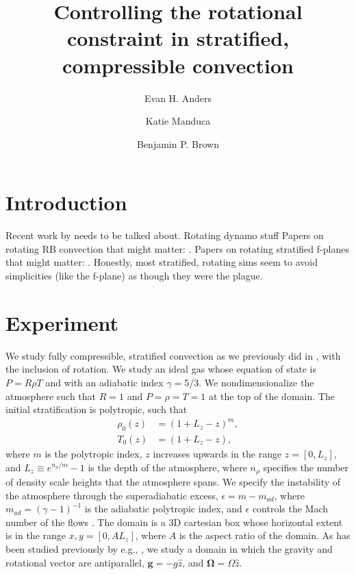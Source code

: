 \documentclass[twocolumn, amsmath, amsfonts, amssymb]{aastex62}
\begin{document}
\title{Controlling the rotational constraint in stratified, compressible convection}


\author{Evan H. Anders}
\author{Katie Manduca}
\author{Benjamin P. Brown}


\begin{abstract}
\end{abstract}


\section{Introduction}
\label{sec:intro}
Recent work by \cite{featherstone&hindman2016} needs to be talked about.
Rotating dynamo stuff \cite{busse2002, brown&all2008, brown&all2010, brown&all2011} 
Papers on rotating RB convection that might matter:
\cite{hathaway&somerville1983, julien&all1996, zhong&all2009, julien&all2012, stellmach&all2014}.
Papers on rotating stratified f-planes that might matter:
\cite{brummell&all1996, brummell&all1998, calkins&all2015a}.  Honestly, most stratified, rotating sims
seem to avoid simplicities (like the f-plane) as though they were the plague.

\section{Experiment} 
\label{sec:experiment}
We study fully compressible, stratified 
convection as we previously did in \cite{anders&brown2017}, with 
the inclusion of rotation. We study an ideal gas whose
equation of state is $P = R \rho T$ and with an adiabatic
index $\gamma = 5/3$. We nondimensionalize the atmosphere such that
$R = 1$ and $P = \rho = T = 1$ at the top of the domain.
The initial stratification is polytropic, such that
\begin{equation}
\begin{split}
\rho_0(z) &= (1 + L_z - z)^m, \\
T_0(z)    &= (1 + L_z - z),
\label{eqn:polytrope}
\end{split}
\end{equation}
where $m$ is the polytropic index,
$z$ increases upwards in the range $z = [0, L_z]$, and
$L_z \equiv e^{n_\rho/m} - 1$ is the depth of the atmosphere,
where $n_\rho$ specifies the number of density scale heights that the
atmosphere spans. We specify the instability of the atmosphere
through the superadiabatic excess, $\epsilon = m - m_{ad}$, where
$m_{ad} = (\gamma-1)^{-1}$ is the adiabatic polytropic index, and
$\epsilon$ controls the Mach number of the flows \citep{anders&brown2017}.
The domain is a 3D cartesian box whose horizontal extent is in the range
$x, y = [0, AL_z]$, where $A$ is the aspect ratio of the domain.
As has been studied previously by e.g., \cite{julien&all1996, brummell&all1996}, 
we study a domain in which the
gravity and rotational vector are antiparallel, $\bm{g} = -g\hat{z}$,
and $\bm{\Omega} = \Omega \hat{z}$.
\end{document}
